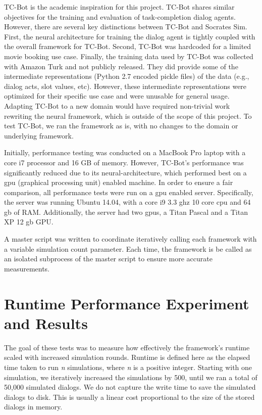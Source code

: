  TC-Bot is the academic inspiration for this project. TC-Bot shares similar objectives for the training and evaluation of task-completion dialog agents. However, there are several key distinctions between TC-Bot and Socrates Sim. First, the neural architecture for training the dialog agent is tightly coupled with the overall framework for TC-Bot. Second, TC-Bot was hardcoded for a limited movie booking use case. Finally, the training data used by TC-Bot was collected with Amazon Turk and not publicly released. They did provide some of the intermediate representations (Python 2.7 encoded pickle files) of the data (e.g., dialog acts, slot values, etc). However, these intermediate representations were optimized for their specific use case and were unusable for general usage. Adapting TC-Bot to a new domain would have required non-trivial work rewriting the neural framework, which is outside of the scope of this project. To test TC-Bot, we ran the framework as is, with no changes to the domain or underlying framework. 

Initially, performance testing was conducted on a MacBook Pro laptop with a core i7 processor and 16 GB of memory. However, TC-Bot's performance was significantly reduced due to its neural-architecture, which performed best on a gpu (graphical processing unit) enabled machine. In order to ensure a fair comparison, all performance tests were run on a gpu enabled server. Specifically, the server was running Ubuntu 14.04, with a core i9 3.3 ghz 10 core cpu and  64 gb of RAM. Additionally, the server had two gpus, a Titan Pascal and a Titan XP 12 gb GPU. 

A master script was written to coordinate iteratively calling each framework with a variable simulation count parameter. Each time, the framework is be called as an isolated subprocess of the master script to ensure more accurate measurements. 

\section{Runtime Performance Experiment and Results}

The goal of these tests was to measure how effectively the framework's runtime scaled with increased simulation rounds. Runtime is defined here as the elapsed time taken to run \textit{n} simulations, where \textit{n} is a positive integer. Starting with one simulation, we iteratively increased the simulations by 500, until we ran a total of 50,000 simulated dialogs. We do not capture the write time to save the simulated dialogs to disk. This is usually a linear cost proportional to the size of the stored dialogs in memory. 

